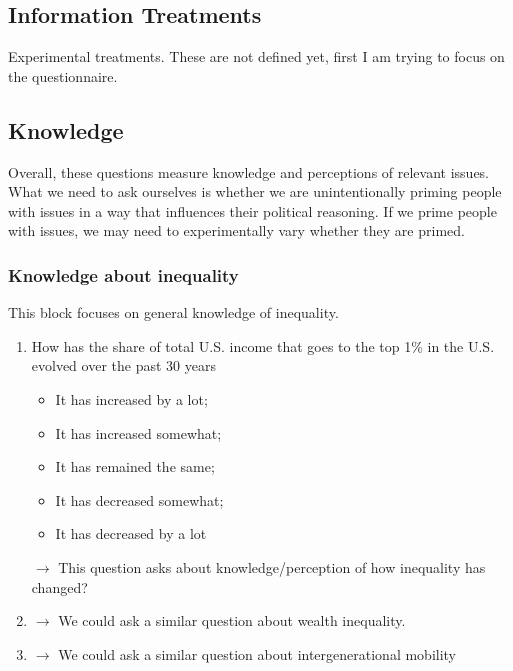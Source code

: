 \documentclass[12pt]{article}
\begin{document}
\subsection{Information Treatments}
Experimental treatments. These are not defined yet, first I am trying to focus on the questionnaire. 
\subsection{Knowledge}
Overall, these questions measure knowledge and perceptions of relevant issues. What we need to ask ourselves is whether we are unintentionally priming people with issues in a way that influences their political reasoning. If we prime people with issues, we may need to experimentally vary whether they are primed. 
\subsubsection{Knowledge about inequality}
This block focuses on general knowledge of inequality. 
\begin{enumerate}
    \item How has the share of total U.S. income that goes to the top 1\% in the U.S. evolved over the past 30 years
    \begin{itemize}
        \item It has increased by a lot; 
        \item It has increased somewhat; 
        \item It has remained the same; 
        \item It has decreased somewhat; 
        \item It has decreased by a lot
    \end{itemize} $\rightarrow$ This question asks about knowledge/perception of how inequality has changed?
    \item $\rightarrow$ We could ask a similar question about wealth inequality.
    \item $\rightarrow$ We could ask a similar question about intergenerational mobility
\end{enumerate}
\end{document}
